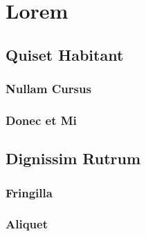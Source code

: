 \chapter{Lorem}

\lipsum[1-3]

\section{Quiset Habitant}

\lipsum[4-10]

\subsection{Nullam Cursus}

\lipsum[11-13]

\subsection{Donec et Mi}

\lipsum[14-17]

\section{Dignissim Rutrum}

\lipsum[20-26]

\subsection{Fringilla}

\lipsum[26-28]

\subsection{Aliquet}

\lipsum[29-30]

